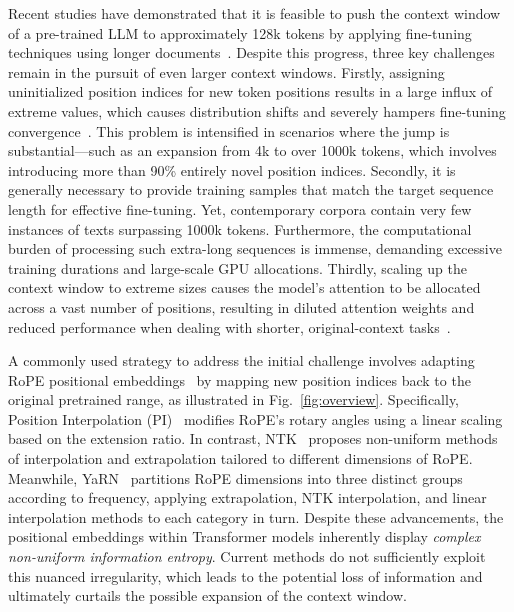Recent studies have demonstrated that it is feasible to push the context window of a pre-trained LLM to approximately 128k tokens by applying fine-tuning techniques using longer documents~\cite{longlora,pi,yarn,zhang2024soaring,liu2023scaling}. Despite this progress, three key challenges remain in the pursuit of even larger context windows. Firstly, assigning uninitialized position indices for new token positions results in a large influx of extreme values, which causes distribution shifts and severely hampers fine-tuning convergence~\cite{pi}. This problem is intensified in scenarios where the jump is substantial—such as an expansion from 4k to over 1000k tokens, which involves introducing more than 90\% entirely novel position indices. Secondly, it is generally necessary to provide training samples that match the target sequence length for effective fine-tuning. Yet, contemporary corpora contain very few instances of texts surpassing 1000k tokens. Furthermore, the computational burden of processing such extra-long sequences is immense, demanding excessive training durations and large-scale GPU allocations. Thirdly, scaling up the context window to extreme sizes causes the model’s attention to be allocated across a vast number of positions, resulting in diluted attention weights and reduced performance when dealing with shorter, original-context tasks~\cite{pi}.

A commonly used strategy to address the initial challenge involves adapting RoPE positional embeddings~\cite{rope,pi} by mapping new position indices back to the original pretrained range, as illustrated in Fig.~\ref{fig:overview}. Specifically, Position Interpolation (PI)~\cite{pi} modifies RoPE’s rotary angles using a linear scaling based on the extension ratio. In contrast, NTK~\cite{ntk,dynamicntk} proposes non-uniform methods of interpolation and extrapolation tailored to different dimensions of RoPE. Meanwhile, YaRN~\cite{yarn} partitions RoPE dimensions into three distinct groups according to frequency, applying extrapolation, NTK interpolation, and linear interpolation methods to each category in turn. Despite these advancements, the positional embeddings within Transformer models inherently display \emph{complex non-uniform information entropy}. Current methods do not sufficiently exploit this nuanced irregularity, which leads to the potential loss of information and ultimately curtails the possible expansion of the context window.

